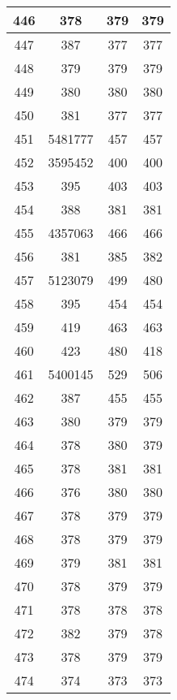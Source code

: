 \begin{table}[H]
\begin{tabular}{|c|c|c|c|}
446 & 378 & 379 & 379 \\
\hline
447 & 387 & 377 & 377 \\
\hline
448 & 379 & 379 & 379 \\
\hline
449 & 380 & 380 & 380 \\
\hline
450 & 381 & 377 & 377 \\
\hline
451 & 5481777 & 457 & 457 \\
\hline
452 & 3595452 & 400 & 400 \\
\hline
453 & 395 & 403 & 403 \\
\hline
454 & 388 & 381 & 381 \\
\hline
455 & 4357063 & 466 & 466 \\
\hline
456 & 381 & 385 & 382 \\
\hline
457 & 5123079 & 499 & 480 \\
\hline
458 & 395 & 454 & 454 \\
\hline
459 & 419 & 463 & 463 \\
\hline
460 & 423 & 480 & 418 \\
\hline
461 & 5400145 & 529 & 506 \\
\hline
462 & 387 & 455 & 455 \\
\hline
463 & 380 & 379 & 379 \\
\hline
464 & 378 & 380 & 379 \\
\hline
465 & 378 & 381 & 381 \\
\hline
466 & 376 & 380 & 380 \\
\hline
467 & 378 & 379 & 379 \\
\hline
468 & 378 & 379 & 379 \\
\hline
469 & 379 & 381 & 381 \\
\hline
470 & 378 & 379 & 379 \\
\hline
471 & 378 & 378 & 378 \\
\hline
472 & 382 & 379 & 378 \\
\hline
473 & 378 & 379 & 379 \\
\hline
474 & 374 & 373 & 373 \\
\hline
\end{tabular}
\end{table}
